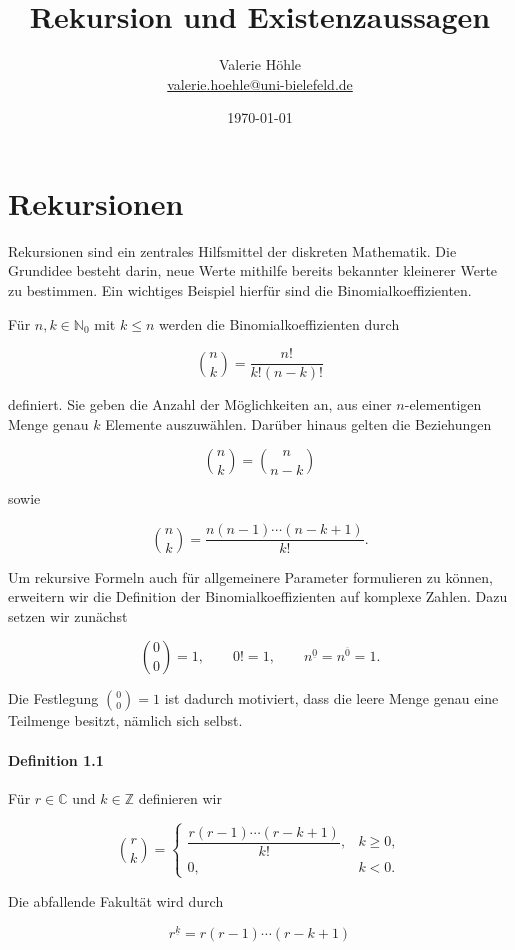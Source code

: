 \documentclass{article}
\title{Rekursion und Existenzaussagen}
\date{\today}
\author{Valerie Höhle\\ \url{valerie.hoehle@uni-bielefeld.de}}
\begin{document}
\justifying

\maketitle
\section{Rekursionen}

Rekursionen sind ein zentrales Hilfsmittel der diskreten Mathematik. Die Grundidee besteht darin, neue Werte mithilfe bereits bekannter kleinerer Werte zu bestimmen. Ein wichtiges Beispiel hierfür sind die Binomialkoeffizienten.

Für \(n,k\in\mathbb{N}_0\) mit \(k\leq n\) werden die Binomialkoeffizienten durch

\[
\binom{n}{k}
=
\frac{n!}{k!(n-k)!}
\]

definiert. Sie geben die Anzahl der Möglichkeiten an, aus einer \(n\)-elementigen Menge genau \(k\) Elemente auszuwählen. Darüber hinaus gelten die Beziehungen

\[
\binom{n}{k}
=
\binom{n}{n-k}
\]

sowie

\[
\binom{n}{k}
=
\frac{n(n-1)\cdots(n-k+1)}{k!}.
\]

Um rekursive Formeln auch für allgemeinere Parameter formulieren zu können, erweitern wir die Definition der Binomialkoeffizienten auf komplexe Zahlen. Dazu setzen wir zunächst

\[
\binom{0}{0}=1,
\qquad
0!=1,
\qquad
n^{\underline 0}
=
n^{\overline 0}
=
1.
\]

Die Festlegung \(\binom{0}{0}=1\) ist dadurch motiviert, dass die leere Menge genau eine Teilmenge besitzt, nämlich sich selbst.

\bigskip

\paragraph{Definition 1.1}

Für \(r\in\mathbb C\) und \(k\in\mathbb Z\) definieren wir

\[
\binom{r}{k}
=
\begin{cases}
\dfrac{r(r-1)\cdots(r-k+1)}{k!}, & k\geq 0,\\[1ex]
0, & k<0.
\end{cases}
\]

Die abfallende Fakultät wird durch

\[
r^{\underline{k}}
=
r(r-1)\cdots(r-k+1)
\]
\end{document}
